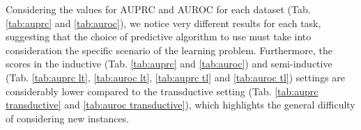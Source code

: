 \documentclass[sn-mathphys-num]{sn-jnl}%
\theoremstyle{thmstyleone}%
\theoremstyle{thmstyletwo}%
\theoremstyle{thmstylethree}%
\begin{document}
Considering the values for AUPRC and AUROC for each dataset (Tab. \ref{tab:auprc} and \ref{tab:auroc}), we notice very different results for each task, suggesting that the choice of predictive algorithm to use must take into consideration the specific scenario of the learning problem. Furthermore, the scores in the inductive (Tab. \ref{tab:auprc} and \ref{tab:auroc}) and semi-inductive (Tab. \ref{tab:auprc lt}, \ref{tab:auroc lt}, \ref{tab:auprc tl} and \ref{tab:auroc tl}) settings are considerably lower compared to the transductive setting (Tab. \ref{tab:auprc transductive} and \ref{tab:auroc transductive}), which highlights the general difficulty of considering new instances.

%
\end{document}
